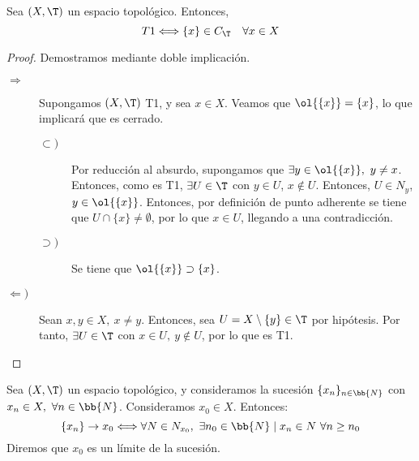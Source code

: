 \begin{prop}
    Sea $(X,\T)$ un espacio topológico. Entonces,
    \begin{equation*}
        T1\Longleftrightarrow \{x\}\in C_\T \quad \forall x\in X
    \end{equation*}
\end{prop}
\begin{proof}
    Demostramos mediante doble implicación.
    \begin{description}
        \item[$\Longrightarrow$] Supongamos $(X,\T)$ T1, y sea $x\in X$. Veamos que $\ol{\{x\}}=\{x\}$, lo que implicará que es cerrado.
        \begin{description}
            \item[$\subset)$]
            Por reducción al absurdo, supongamos que $\exists y\in \ol{\{x\}},~y\neq x$. Entonces, como es T1, $\exists U\in \T$ con $y\in U$, $x\notin U$. Entonces, $U\in N_y$, $y\in \ol{\{x\}}$. Entonces, por definición de punto adherente se tiene que $U\cap \{x\}\neq \emptyset$, por lo que $x\in U$, llegando a una contradicción.

            \item[$\supset)$] Se tiene que $\ol{\{x\}}\supset \{x\}$.
        \end{description}
        
        \item[$\Longleftarrow)$] Sean $x,y\in X,~x\neq y$. Entonces, sea $U=X\setminus \{y\}\in \T$ por hipótesis. Por tanto, $\exists U\in \T$ con $x\in U,~y\notin U$, por lo que es T1.
    \end{description}
\end{proof}


\begin{definicion}
    Sea $(X,\T)$ un espacio topológico, y consideramos la sucesión $\{x_n\}_{n\in \bb{N}}$ con $x_n\in X,~\forall n\in \bb{N}$. Consideramos $x_0\in X$. Entonces:
    \begin{equation*}
        \{x_n\}\to x_0 \Longleftrightarrow \forall N\in N_{x_0},~\exists n_0\in \bb{N} \mid x_n\in N~\forall n\geq n_0
    \end{equation*}
    Diremos que $x_0$ es un límite de la sucesión.
\end{definicion}


